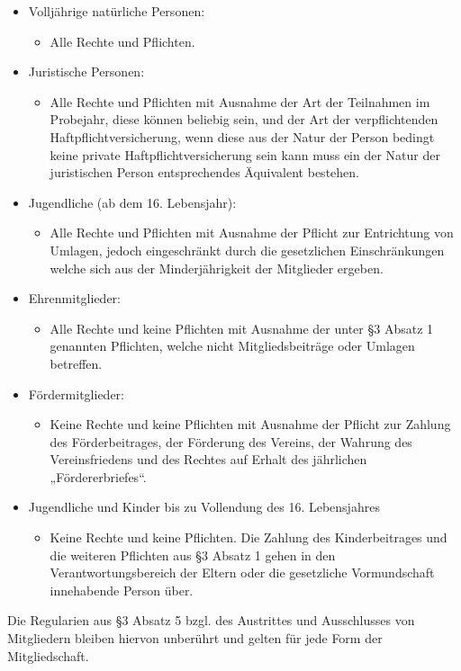 \documentclass[10pt,a4paper]{article}
\begin{document}
\begin{itemize}
\item
Volljährige natürliche Personen:
    \begin{itemize}
        \item
        Alle Rechte und Pflichten.
    \end{itemize}
\item
Juristische Personen:
    \begin{itemize}
        \item
        Alle Rechte und Pflichten mit Ausnahme der Art der Teilnahmen im Probejahr, diese können
        beliebig sein, und der Art der verpflichtenden Haftpflichtversicherung, wenn diese aus der
        Natur der Person bedingt keine private Haftpflichtversicherung sein kann muss ein der Natur
        der juristischen Person entsprechendes Äquivalent bestehen.
    \end{itemize}
\item
Jugendliche (ab dem 16. Lebensjahr):
    \begin{itemize}
        \item
        Alle Rechte und Pflichten mit Ausnahme der Pflicht zur Entrichtung von Umlagen, jedoch
        eingeschränkt durch die gesetzlichen Einschränkungen welche sich aus der Minderjährigkeit
        der Mitglieder ergeben.
    \end{itemize}

\item 
Ehrenmitglieder:
        \begin{itemize}
            \item
            Alle Rechte und keine Pflichten mit Ausnahme der unter §3 Absatz 1 genannten Pflichten,
            welche nicht Mitgliedsbeiträge oder Umlagen betreffen.
        \end{itemize}
\item 
Fördermitglieder:
        \begin{itemize}
        \item
             Keine Rechte und keine Pflichten mit Ausnahme der Pflicht zur Zahlung des Förderbeitrages,
             der Förderung des Vereins, der Wahrung des Vereinsfriedens und des Rechtes auf Erhalt des
             jährlichen „Fördererbriefes“.
        \end{itemize}
        \item 
        Jugendliche und Kinder bis zu Vollendung des 16. Lebensjahres
        \begin{itemize}
            \item
        Keine Rechte und keine Pflichten. Die Zahlung des Kinderbeitrages und die weiteren Pflichten
        aus §3 Absatz 1 gehen in den Verantwortungsbereich der Eltern oder die gesetzliche
        Vormundschaft innehabende Person über.
        \end{itemize}
\end{itemize}
Die Regularien aus §3 Absatz 5 bzgl. des Austrittes und Ausschlusses von Mitgliedern bleiben hiervon unberührt
und gelten für jede Form der Mitgliedschaft.
\end{document}
